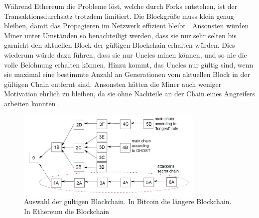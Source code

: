 Während Ethereum die Probleme löst, welche durch Forks entstehen, ist der Transaktionsdurchsatz trotzdem limitiert. Die Blockgröße muss klein genug bleiben, damit das Propagieren im Netzwerk effizient bleibt \cite{SchererPerformanceScalabilityBlockchain2017}. Ansonsten würden Miner unter Umständen so benachteiligt werden, dass sie nur sehr selten bis garnicht den aktuellen Block der gültigen Blockchain erhalten würden. Dies wiederum würde dazu führen, dass sie nur Uncles minen können, und so nie die volle Belohnung erhalten können. Hinzu kommt, das Uncles nur gültig sind, wenn sie maximal eine bestimmte Anzahl an Generationen vom aktuellen Block in der gültigen Chain entfernt sind. Ansonsten hätten die Miner auch weniger Motivation ehrlich zu bleiben, da sie ohne Nachteile an der Chain eines Angreifers arbeiten könnten \cite{EthereumWhitepaper2017}.

\begin{figure}[htb]
  \centering
    \includegraphics[width=0.8\textwidth,angle=0]{images/forking-risks}
     \caption{Auswahl der gültigen Blockchain. In Bitcoin die längere Blockchain. In Ethereum die Blockchain }
    \label{fig:forking-risks}
\end{figure} 


